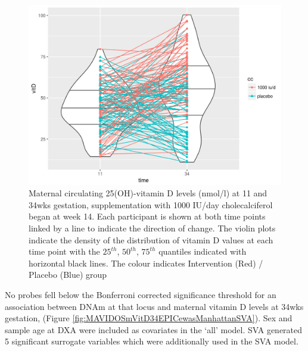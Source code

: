 \documentclass[
]{book}
\begin{document}
\begin{figure}

{\centering \includegraphics[width=0.8\linewidth]{figs/MAVIDOSvitDviolinMonApr162018} 

}

\caption{Maternal circulating 25(OH)-vitamin D levels (nmol/l) at 11 and 34wks gestation, supplementation with 1000 IU/day cholecalciferol began at week 14. Each participant is shown at both time points linked by a line to indicate the direction of change. The violin plots indicate the density of the distribution of vitamin D values at each time point with the \(25^{th}\), \(50^{th}\), \(75^{th}\) quantiles indicated with horizontal black lines. The colour indicates Intervention (Red) / Placebo (Blue) group}\label{fig:MAVIDOSvitDviolinMonApr162018}
\end{figure}



No probes fell below the Bonferroni corrected significance threshold for an association between DNAm at that locus and maternal vitamin D levels at 34wks gestation, (Figure \ref{fig:MAVIDOSmVitD34EPICewasManhattanSVA}).
Sex and sample age at DXA were included as covariates in the `all' model.
SVA generated 5 significant surrogate variables which were additionally used in the SVA model.
\end{document}
